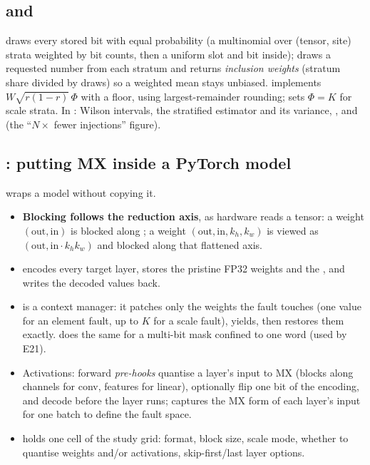 \subsection{ and }
 draws every stored bit with equal probability (a multinomial over (tensor, site) strata weighted by bit counts, then a uniform slot and bit inside);  draws a requested number from each stratum and returns \emph{inclusion weights}
(stratum share divided by draws) so a weighted mean stays unbiased.  implements $W\sqrt{r(1-r)}\,\Phi$ with a floor, using largest-remainder rounding;  sets $\Phi=K$ for scale strata. In : Wilson intervals, the stratified estimator and its variance,
, and  (the ``$N\times$ fewer injections'' figure).

\subsection{: putting MX inside a PyTorch model}
 wraps a model without copying it.
\begin{itemize}
\item \textbf{Blocking follows the reduction axis}, as hardware reads a tensor: a  weight $(\text{out},\text{in})$ is blocked along ; a  weight $(\text{out},\text{in},k_h,k_w)$ is viewed as $(\text{out},\text{in}\cdot k_h k_w)$ and blocked along that flattened axis.
\item {} encodes every target layer, stores the pristine FP32 weights and the , and writes the decoded values back.
\item {} is a context manager: it patches only the weights the fault touches (one value for an element fault, up to $K$ for a scale fault), yields, then restores them exactly.  does the same for a multi-bit mask confined to one word (used by E21).
\item Activations: forward \emph{pre-hooks} quantise a layer's input to MX (blocks along channels for conv, features for linear), optionally flip one bit of the encoding, and decode before the layer runs;  captures the MX form of each layer's input for one batch to define the fault space.
\item {} holds one cell of the study grid: format, block size, scale mode, whether to quantise weights and/or activations, skip-first/last layer options.
\end{itemize}

